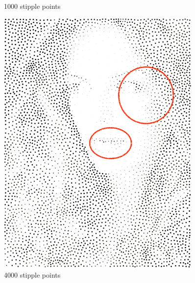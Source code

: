 \documentclass[11pt]{article}
\begin{document}
\begin{figure}[htbp]
\begin{minipage}[t]{0.48\textwidth}
\caption{1000 stipple points}
\end{minipage}
\end{figure}


\begin{figure}[htbp]
\begin{minipage}[t]{0.48\textwidth}
\centering
\includegraphics[width = 0.9\textwidth]{fairyeyes-4000.png}
\caption{4000 stipple points}
\end{minipage}
\begin{minipage}[t]{0.48\textwidth}
\centering

\end{minipage}
\end{figure}
\end{document}
